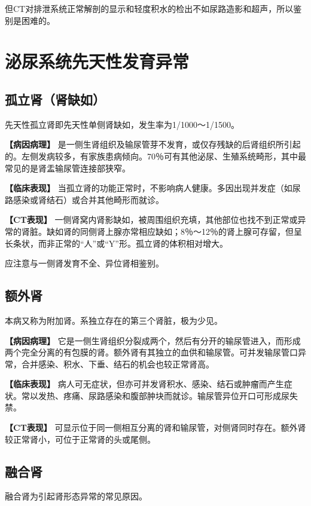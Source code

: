 但CT对排泄系统正常解剖的显示和轻度积水的检出不如尿路造影和超声，所以鉴别是困难的。

\section{泌尿系统先天性发育异常}

\subsection{孤立肾（肾缺如）}

先天性孤立肾即先天性单侧肾缺如，发生率为1/1000～1/1500。

\textbf{【病因病理】}
是一侧生肾组织及输尿管芽不发育，或仅存残缺的后肾组织所引起的。左侧发病较多，有家族患病倾向。70％可有其他泌尿、生殖系统畸形，其中最常见的是肾盂输尿管连接部狭窄。

\textbf{【临床表现】}
当孤立肾的功能正常时，不影响病人健康。多因出现并发症（如尿路感染或肾结石）或合并其他畸形而就诊。

\textbf{【CT表现】}
一侧肾窝内肾影缺如，被周围组织充填，其他部位也找不到正常或异常的肾脏。缺如肾的同侧肾上腺亦常相应缺如；8％～12％的肾上腺可存留，但呈长条状，而非正常的“人”或“Y”形。孤立肾的体积相对增大。

应注意与一侧肾发育不全、异位肾相鉴别。

\subsection{额外肾}

本病又称为附加肾。系独立存在的第三个肾脏，极为少见。

\textbf{【病因病理】}
它是一侧生肾组织分裂成两个，然后有分开的输尿管进入，而形成两个完全分离的有包膜的肾。额外肾有其独立的血供和输尿管。可并发输尿管口异常，合并感染、积水、下垂、结石的机会也较正常肾高。

\textbf{【临床表现】}
病人可无症状，但亦可并发肾积水、感染、结石或肿瘤而产生症状。常以发热、疼痛、尿路感染和腹部肿块而就诊。输尿管异位开口可形成尿失禁。

\textbf{【CT表现】}
可显示位于同一侧相互分离的肾和输尿管，对侧肾同时存在。额外肾较正常肾小，可位于正常肾的头或尾侧。

\subsection{融合肾}

融合肾为引起肾形态异常的常见原因。

